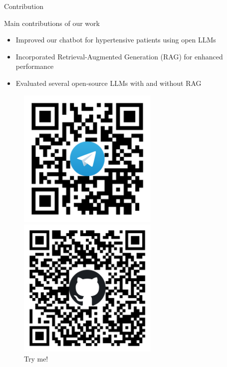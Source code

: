 \documentclass[handout]{beamer}\mode<handout>{\usetheme{AMSBolognaFC}}
\begin{document}
\begin{frame}{Contribution}

    \begin{block}{Main contributions of our work}
        \begin{itemize}
            \item Improved our chatbot for hypertensive patients using \alert{open LLMs}
            \item Incorporated \alert{Retrieval-Augmented Generation (RAG)} for enhanced performance
            \item \alert{Evaluated} several open-source LLMs with and without RAG
        \end{itemize}
    \end{block}
    \vfill
    \begin{figure}
        \begin{minipage}{0.3\textwidth}
            \centering
            \includegraphics[width=0.6\textwidth]{figures/telegram-bot}
            \caption{Try me!}
        \end{minipage}
        \hspace{0.2cm}
        \begin{minipage}{0.3\textwidth}
            \centering
            \includegraphics[width=0.6\textwidth]{figures/github-repo}

\end{minipage}
\end{figure}
\end{frame}
\end{document}

